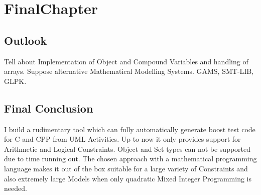 \chapter{FinalChapter}
\section{Outlook}
Tell about Implementation of Object and Compound Variables and handling of arrays.
Suppose alternative Mathematical Modelling Systems. GAMS, SMT-LIB, GLPK.
\section{Final Conclusion}I build a rudimentary tool which can fully automatically generate boost test code for C and CPP from UML Activities. Up to now it only provides support for Arithmetic and Logical Constraints. Object and Set types can not be supported due to time running out. The chosen approach with a mathematical programming language makes it out of the box suitable for a large variety of Constraints and also extremely large Models when only quadratic Mixed Integer Programming is needed.